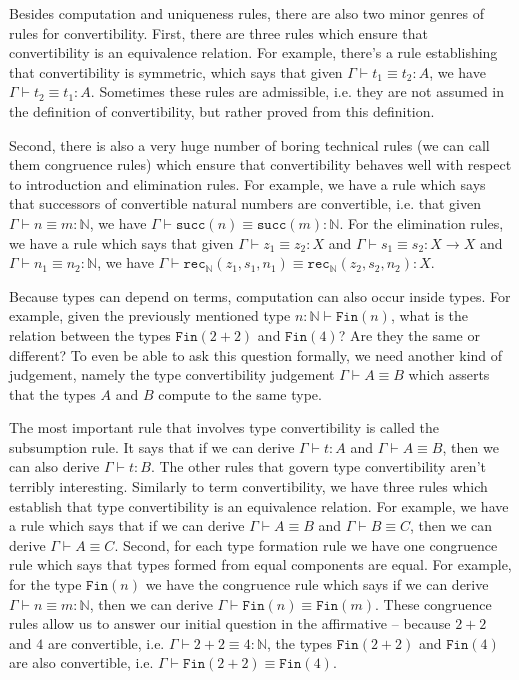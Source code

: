 \documentclass[declaration,mgr,english,shortabstract]{iithesis}
\newcommand{\m}[1]{\texttt{#1}}
\newcommand{\type}[2]{#1 \vdash #2}
\newcommand{\typeconv}[3]{#1 \vdash #2 \equiv #3}
\newcommand{\term}[3]{#1 \vdash #2 : #3}
\newcommand{\termconv}[4]{#1 \vdash #2 \equiv #3 : #4}
\newcommand{\N}{\mathbb{N}}
\newcommand{\suc}[1]{\m{succ}(#1)}
\newcommand{\recN}[3]{\m{rec}_\N(#1, #2, #3)}
\newcommand{\Fin}[1]{\m{Fin}(#1)}
\begin{document}
Besides computation and uniqueness rules, there are also two minor genres of rules for convertibility. First, there are three rules which ensure that convertibility is an equivalence relation. For example, there's a rule establishing that convertibility is symmetric, which says that given $\termconv{\Gamma}{t_1}{t_2}{A}$, we have $\termconv{\Gamma}{t_2}{t_1}{A}$. Sometimes these rules are admissible, i.e. they are not assumed in the definition of convertibility, but rather proved from this definition.

Second, there is also a very huge number of boring technical rules (we can call them congruence rules) which ensure that convertibility behaves well with respect to introduction and elimination rules. For example, we have a rule which says that successors of convertible natural numbers are convertible, i.e. that given $\termconv{\Gamma}{n}{m}{\N}$, we have $\termconv{\Gamma}{\suc{n}}{\suc{m}}{\N}$. For the elimination rules, we have a rule which says that given $\termconv{\Gamma}{z_1}{z_2}{X}$ and $\termconv{\Gamma}{s_1}{s_2}{X \to X}$ and $\termconv{\Gamma}{n_1}{n_2}{\N}$, we have $\termconv{\Gamma}{\recN{z_1}{s_1}{n_1}}{\recN{z_2}{s_2}{n_2}}{X}$.

Because types can depend on terms, computation can also occur inside types. For example, given the previously mentioned type $\type{n : \N}\Fin{n}$, what is the relation between the types $\Fin{2 + 2}$ and $\Fin{4}$? Are they the same or different? To even be able to ask this question formally, we need another kind of judgement, namely the type convertibility judgement $\typeconv{\Gamma}{A}{B}$ which asserts that the types $A$ and $B$ compute to the same type.

The most important rule that involves type convertibility is called the subsumption rule. It says that if we can derive $\term{\Gamma}{t}{A}$ and $\typeconv{\Gamma}{A}{B}$, then we can also derive $\term{\Gamma}{t}{B}$. The other rules that govern type convertibility aren't terribly interesting. Similarly to term convertibility, we have three rules which establish that type convertibility is an equivalence relation. For example, we have a rule which says that if we can derive $\typeconv{\Gamma}{A}{B}$ and $\typeconv{\Gamma}{B}{C}$, then we can derive $\typeconv{\Gamma}{A}{C}$. Second, for each type formation rule we have one congruence rule which says that types formed from equal components are equal. For example, for the type $\Fin{n}$ we have the congruence rule which says if we can derive $\termconv{\Gamma}{n}{m}{\N}$, then we can derive $\typeconv{\Gamma}{\Fin{n}}{\Fin{m}}$. These congruence rules allow us to answer our initial question in the affirmative -- because $2 + 2$ and $4$ are convertible, i.e. $\termconv{\Gamma}{2 + 2}{4}{\N}$, the types $\Fin{2 + 2}$ and $\Fin{4}$ are also convertible, i.e. $\typeconv{\Gamma}{\Fin{2 + 2}}{\Fin{4}}$. 
\end{document}
